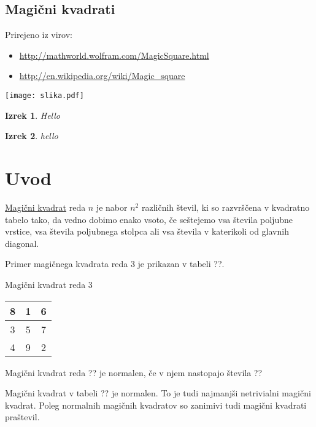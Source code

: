 \documentclass[a4paper,12pt]{article}
\newtheorem{izrek}{Izrek}
\begin{document}
\begin{center}
   \section*{Magični kvadrati}
\end{center}



Prirejeno iz virov:

\begin{itemize}
 \item \url{http://mathworld.wolfram.com/MagicSquare.html}
 \item \url{http://en.wikipedia.org/wiki/Magic_square} 
\end{itemize}
    
\texttt{[image: slika.pdf]}

\tableofcontents
\pagebreak
\begin{izrek}
   Hello
\end{izrek}
\begin{izrek}
 hello
\end{izrek}
\section{Uvod}

   \underline{Magični kvadrat} reda $n$ je nabor $n^2$ različnih števil,
   ki so razvrščena v kvadratno tabelo tako, da vedno dobimo enako vsoto,
   če seštejemo vsa števila poljubne vrstice, vsa števila poljubnega
   stolpca ali vsa števila v katerikoli od glavnih diagonal.

Primer magičnega kvadrata reda 3 je prikazan v tabeli ??.

Magični kvadrat reda 3
\begin{center}
   \begin{tabular}{|c|c|c|}
      \hline
   8 & 1 & 6 \\\hline
   3 & 5 & 7 \\\hline
   4 & 9 & 2 \\\hline
   \end{tabular}
\end{center}


   Magični kvadrat reda ?? je normalen, če v njem nastopajo števila
   ??

Magični kvadrat v tabeli ?? je normalen.
To je tudi najmanjši netrivialni magični kvadrat.
Poleg normalnih magičnih kvadratov so zanimivi tudi magični kvadrati praštevil.
\end{document}
